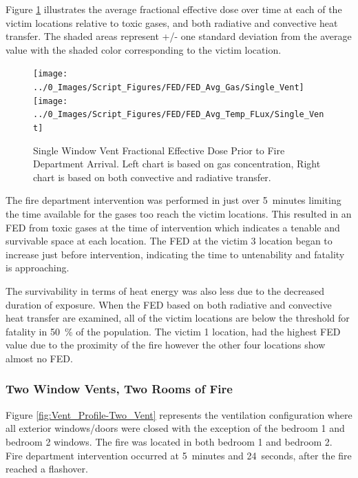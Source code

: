 \documentclass[12pt,oneside]{book}
\begin{document}
Figure \ref{fig:FED_SingleVent} illustrates the average fractional effective dose over time at each of the victim locations relative to toxic gases, and both radiative and convective heat transfer. The shaded areas represent +/- one standard deviation from the average value with the shaded color corresponding to the victim location. 

\begin{figure}[H]
	\centering
	\texttt{[image: ../0\_Images/Script\_Figures/FED/FED\_Avg\_Gas/Single\_Vent]}
	\texttt{[image: ../0\_Images/Script\_Figures/FED/FED\_Avg\_Temp\_FLux/Single\_Vent]}
	\caption[Single Window Vent Fractional Effective Dose]{Single Window Vent Fractional Effective Dose Prior to Fire Department Arrival. Left chart is based on gas concentration, Right chart is based on both convective and radiative transfer.}
	\label{fig:FED_SingleVent}
\end{figure}

The fire department intervention was performed in just over 5~minutes limiting the time available for the gases too reach the victim locations. This resulted in an FED from toxic gases at the time of intervention which indicates a tenable and survivable space at each location. The FED at the victim 3 location began to increase just before intervention, indicating the time to untenability and fatality is approaching. 

The survivability in terms of heat energy was also less due to the decreased duration of exposure. When the FED based on both radiative and convective heat transfer are examined, all of the victim locations are below the threshold for fatality in 50~\% of the population. The victim 1 location, had the highest FED value due to the proximity of the fire however the other four locations show almost no FED. 

\subsubsection{Two Window Vents, Two Rooms of Fire}

Figure \ref{fig:Vent_Profile-Two_Vent} represents the ventilation configuration where all exterior windows/doors were closed with the exception of the bedroom 1 and bedroom 2 windows. The fire was located in both bedroom 1 and bedroom 2. Fire department intervention occurred at 5~minutes and 24~seconds, after the fire reached a flashover. 
\end{document}
